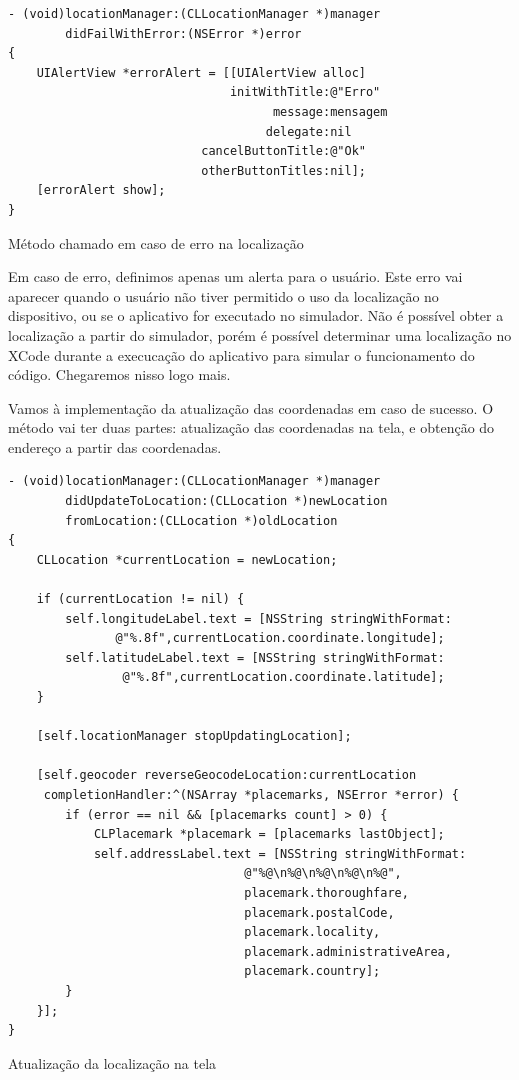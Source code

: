 \documentclass[a4paper,12pt,brazil,doubleside]{book}
\begin{document}
\begin{singlespace}
\begin{listing}[H]
\begin{verbatim}
- (void)locationManager:(CLLocationManager *)manager
        didFailWithError:(NSError *)error
{
    UIAlertView *errorAlert = [[UIAlertView alloc]
                               initWithTitle:@"Erro"
                                     message:mensagem
                                    delegate:nil
                           cancelButtonTitle:@"Ok"
                           otherButtonTitles:nil];
    [errorAlert show];
}
\end{verbatim}
\caption{Método chamado em caso de erro na localização}
\end{listing}


Em caso de erro, definimos apenas um alerta para o usuário. Este erro vai aparecer quando o usuário não tiver permitido o uso da localização no dispositivo, ou se o aplicativo for executado no simulador. Não é possível obter a localização a partir do simulador, porém é possível determinar uma localização no XCode durante a execucação do aplicativo para simular o funcionamento do código. Chegaremos nisso logo mais.

Vamos à implementação da atualização das coordenadas em caso de sucesso. O método vai ter duas partes: atualização das coordenadas na tela, e obtenção do endereço a partir das coordenadas.

\begin{listing}[H]
\begin{verbatim}
- (void)locationManager:(CLLocationManager *)manager
        didUpdateToLocation:(CLLocation *)newLocation
        fromLocation:(CLLocation *)oldLocation
{
    CLLocation *currentLocation = newLocation;
    
    if (currentLocation != nil) {
        self.longitudeLabel.text = [NSString stringWithFormat:
               @"%.8f",currentLocation.coordinate.longitude];
        self.latitudeLabel.text = [NSString stringWithFormat:
                @"%.8f",currentLocation.coordinate.latitude];
    }
    
    [self.locationManager stopUpdatingLocation];
    
    [self.geocoder reverseGeocodeLocation:currentLocation
     completionHandler:^(NSArray *placemarks, NSError *error) {
        if (error == nil && [placemarks count] > 0) {
            CLPlacemark *placemark = [placemarks lastObject];
            self.addressLabel.text = [NSString stringWithFormat:
                                 @"%@\n%@\n%@\n%@\n%@",
                                 placemark.thoroughfare,
                                 placemark.postalCode,
                                 placemark.locality,
                                 placemark.administrativeArea,
                                 placemark.country];
        }
    }];
}
\end{verbatim}
\caption{Atualização da localização na tela}
\end{listing}



\end{singlespace}
\end{document}
